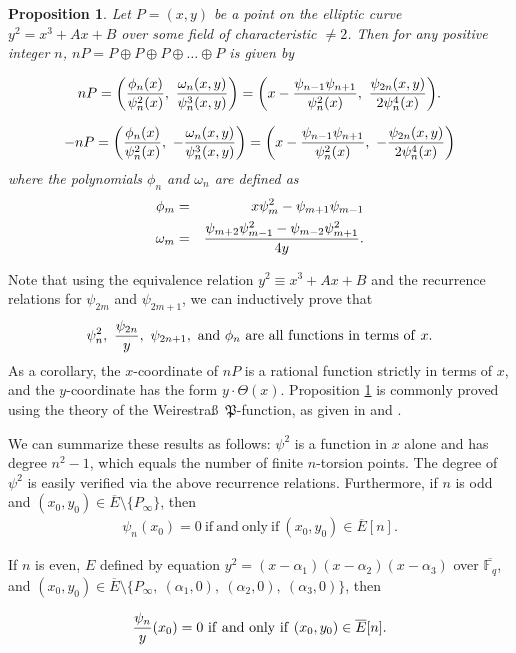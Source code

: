 \documentclass{article}
\newtheorem{Prop}{Proposition}
\newcommand{\f}{\mathbb{F}}
\begin{document}
\begin{Prop} \label{elladd}
Let $P= (x,y)$ be a point on the elliptic curve $y^2=x^3+Ax+B$ over some field of characteristic $\not = 2$.  Then for any positive integer
$n$, $nP = P \oplus P \oplus P \oplus \dots \oplus P$ is given by

$$nP = \bigg({ \phi_n(x)\over \psi_n^2(x)} , ~{\omega_n(x,y) \over \psi_n^3(x,y)}\bigg) =\bigg(x-{\psi_{n-1}\psi_{n+1}\over \psi_n^2(x)} ,
~{\psi_{2n}(x,y) \over 2\psi_n^4(x)}\bigg).$$

$$-nP = \bigg({\phi_n(x)\over \psi_n^2(x)} , ~-{\omega_n(x,y) \over \psi_n^3(x,y)}\bigg) = \bigg(x-{\psi_{n-1}\psi_{n+1}\over \psi_n^2(x)} ,
~-{\psi_{2n}(x,y) \over 2\psi_n^4(x)}\bigg)$$
where the polynomials $\phi_n$ and $\omega_n$ are defined as
\begin{eqnarray*}
\phi_m &=& x\psi_m^2 - \psi_{m+1}\psi_{m-1} \\
\omega_m &=& {\psi_{m+2}\psi_{m-1}^2 - \psi_{m-2}\psi_{m+1}^2 \over 4y}.
\end{eqnarray*}

\end{Prop}
Note that using the equivalence relation $y^2 \equiv x^3 + Ax+B$ and
the recurrence relations for $\psi_{2m}$ and $\psi_{2m+1}$, we can
inductively prove that $$\psi_n^2, ~{\psi_{2n} \over y},
~\psi_{2n+1},~\mathrm{and~}\phi_n
\mathrm{~are~all~functions~in~terms~of~}x.$$ As a corollary, the
$x$-coordinate of $nP$ is a rational function strictly in terms of
$x$, and the $y$-coordinate has the form $y\cdot\Theta(x)$.
Proposition \ref{elladd} is commonly proved using the theory of the
Weirestra\ss~$\mathfrak{P}$-function, as given in \cite{Lang} and
\cite[Chapter 9]{Wash}.


We can summarize these results as follows: $\psi^2$ is a function in
$x$ alone and has degree $n^2-1$, which equals the number of finite
$n$-torsion points.  The degree of $\psi^2$ is easily verified via
the above recurrence relations.  Furthermore, if $n$ is odd and
$(x_0,y_0) \in \overline{E} \setminus \{P_\infty\}$, then
\begin{eqnarray} \label{oddpsi} \psi_n(x_0) = 0
\mathrm{~if~and~only~if~}(x_0,y_0) \in
\overline{E}[n].\end{eqnarray}

If $n$ is even, $E$ defined by equation $y^2 = (x-\alpha_1)(x-\alpha_2)(x-\alpha_3)$ over
$\overline{\f_q}$, and $(x_0,y_0) \in \overline{E} \setminus \{P_\infty,
~(\alpha_1,0),~(\alpha_2,0),~(\alpha_3,0)\}$, then

\begin{eqnarray} {\psi_n \over y}(x_0) = 0 \mathrm{~if~and~only~if~}(x_0,y_0) \in
\overline{E}[n].\end{eqnarray}
\end{document}
